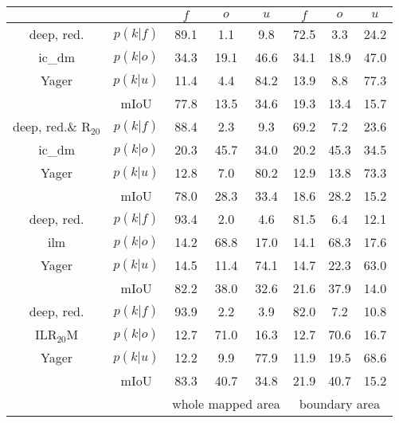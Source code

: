 \begin{center}
		\begin{tabular}{c|c|ccc|ccc}
			& \backslashbox{}{\scriptsize{$k$}} & $f$ & $o$ & $u$ & $f$ & $o$ & $u$\\
			\hline
			deep, red.&$p(k|f)$ & \textcolor{mygreen}{89.1} & \textcolor{myred}{1.1} & 9.8& \textcolor{mygreen}{72.5} & \textcolor{myred}{3.3} & 24.2 \\
			\gls{ic_dm}&$p(k|o)$ & \textcolor{myred}{34.3} & \textcolor{mygreen}{19.1} & 46.6& \textcolor{myred}{34.1} & \textcolor{mygreen}{18.9} & 47.0 \\
			Yager&$p(k|u)$ & 11.4 & 4.4 & 84.2& 13.9 & 8.8 & 77.3 \\
			& mIoU &77.8&13.5&34.6&19.3&13.4&15.7 \\
			\hline
			deep, red.\& R$_{20}$ &$p(k|f)$ & \textcolor{mygreen}{88.4} & \textcolor{myred}{2.3} & 9.3& \textcolor{mygreen}{69.2} & \textcolor{myred}{7.2} & 23.6 \\
			\gls{ic_dm}&$p(k|o)$ & \textcolor{myred}{20.3} & \textcolor{mygreen}{45.7} & 34.0& \textcolor{myred}{20.2} & \textcolor{mygreen}{45.3} & 34.5 \\
			Yager&$p(k|u)$ & 12.8 & 7.0 & 80.2& 12.9 & 13.8 & 73.3 \\
			& mIoU &78.0&28.3&33.4&18.6&28.2&15.2 \\
			\hline
			deep, red.&$p(k|f)$ & \textcolor{mygreen}{93.4} & \textcolor{myred}{2.0} & 4.6& \textcolor{mygreen}{81.5} & \textcolor{myred}{6.4} & 12.1 \\
			\gls{ilm}&$p(k|o)$ & \textcolor{myred}{14.2} & \textcolor{mygreen}{68.8} & 17.0& \textcolor{myred}{14.1} & \textcolor{mygreen}{68.3} & 17.6 \\
			Yager&$p(k|u)$ & 14.5 & 11.4 & 74.1& 14.7 & 22.3 & 63.0 \\
			& mIoU &82.2&38.0&32.6&21.6&37.9&14.0 \\
			\hline
			deep, red.&$p(k|f)$ & \textcolor{mygreen}{93.9} & \textcolor{myred}{2.2} & 3.9& \textcolor{mygreen}{82.0} & \textcolor{myred}{7.2} & 10.8 \\
			ILR$_{20}$M&$p(k|o)$ & \textcolor{myred}{12.7} & \textcolor{mygreen}{71.0} & 16.3& \textcolor{myred}{12.7} & \textcolor{mygreen}{70.6} & 16.7 \\
			Yager&$p(k|u)$ & 12.2 & 9.9 & 77.9& 11.9 & 19.5 & 68.6 \\
			& mIoU &83.3&40.7&34.8&21.9&40.7&15.2 \\
			\hline
			& & \multicolumn{3}{c|}{whole mapped area} & \multicolumn{3}{c}{boundary area}
	\end{tabular}
\end{center}
